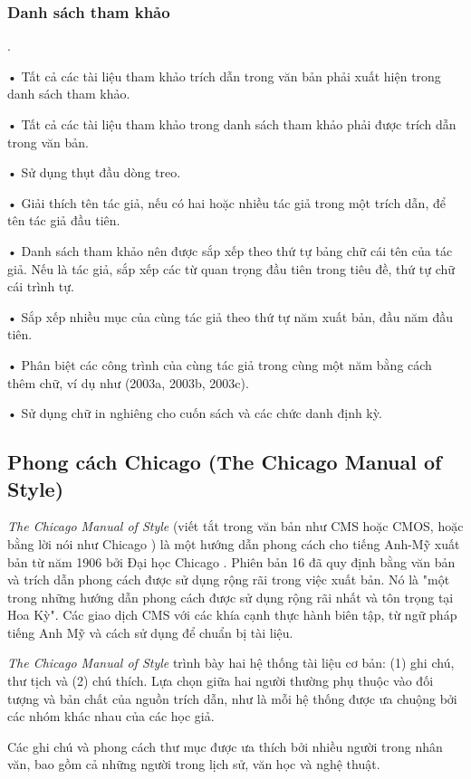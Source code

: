 \documentclass{hcmutarticle}
\begin{document}
 
\subsubsection{Danh sách tham khảo}.

• Tất cả các tài liệu tham khảo trích dẫn trong văn bản phải xuất hiện trong danh sách tham khảo. 

• Tất cả các tài liệu tham khảo trong danh sách tham khảo phải được trích dẫn trong văn bản. 

• Sử dụng thụt đầu dòng treo. 

• Giải thích tên tác giả, nếu có hai hoặc nhiều tác giả trong một trích dẫn, để tên tác giả đầu tiên. 

• Danh sách tham khảo nên được sắp xếp theo thứ tự bảng chữ cái tên của tác giả. Nếu là tác giả, sắp xếp các từ quan trọng đầu tiên trong tiêu đề, thứ tự chữ cái trình tự. 

• Sắp xếp nhiều mục của cùng tác giả theo thứ tự năm xuất bản, đầu năm đầu tiên. 

• Phân biệt các công trình của cùng tác giả trong cùng một năm bằng cách thêm chữ, ví dụ như (2003a, 2003b, 2003c). 

• Sử dụng chữ in nghiêng cho cuốn sách và các chức danh định kỳ.


\subsection{Phong cách Chicago (The Chicago Manual of Style) }

{\em The Chicago Manual of Style} (viết tắt trong văn bản như CMS hoặc CMOS, hoặc bằng lời nói như Chicago ) là một hướng dẫn phong cách cho tiếng Anh-Mỹ xuất bản từ năm 1906 bởi Đại học Chicago . Phiên bản 16 đã quy định bằng văn bản và trích dẫn phong cách được sử dụng rộng rãi trong việc xuất bản. Nó là "một trong những hướng dẫn phong cách được sử dụng rộng rãi nhất và tôn trọng tại Hoa Kỳ". Các giao dịch CMS với các khía cạnh thực hành biên tập, từ ngữ pháp tiếng Anh Mỹ và cách sử dụng để chuẩn bị tài liệu.

{\em The Chicago Manual of Style} trình bày hai hệ thống tài liệu cơ bản: (1) ghi chú, thư tịch và (2) chú thích. Lựa chọn giữa hai người thường phụ thuộc vào đối tượng và bản chất của nguồn trích dẫn, như là mỗi hệ thống được ưa chuộng bởi các nhóm khác nhau của các học giả.

Các ghi chú và phong cách thư mục được ưa thích bởi nhiều người trong nhân văn, bao gồm cả những người trong lịch sử, văn học và nghệ thuật.
\end{document}
